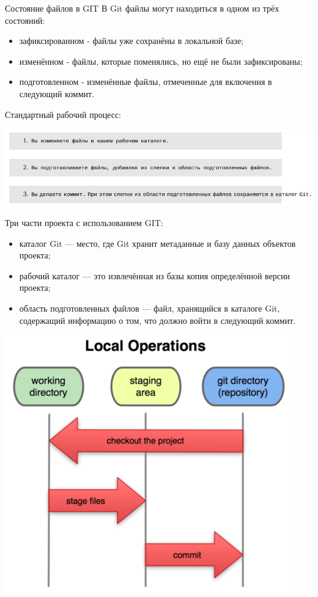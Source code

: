 \documentclass{beamer}
\begin{document}
\begin{frame}{Состояние файлов в GIT}
В Git файлы могут находиться в одном из трёх состояний:
\begin{itemize}
\item зафиксированном - файлы уже сохранёны в локальной базе;
\item изменённом - файлы, которые поменялись, но ещё не были зафиксированы;
\item подготовленном - изменённые файлы, отмеченные для включения в следующий коммит.
\end{itemize}
Стандартный рабочий процесс:
\begin{center}
\includegraphics[scale=0.5]{images/process.png}
\end{center}
\end{frame} 

\begin{frame}
Три части проекта с использованием GIT:
\begin{itemize}
\item каталог Git — место, где Git хранит метаданные и базу данных объектов проекта;
\item рабочий каталог — это извлечённая из базы копия определённой версии проекта;
\item область подготовленных файлов — файл, хранящийся в каталоге Git, содержащий информацию о том, что должно войти в следующий коммит.
\end{itemize}
\begin{center}
\includegraphics[scale=0.4]{images/catalog.png}
\end{center}
\end{frame} 
\end{document}
